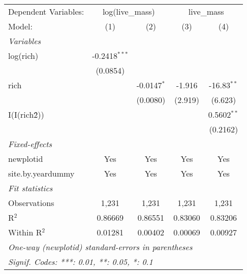 \begin{tabular}{lcccc}
\tabularnewline\midrule\midrule
Dependent Variables:&\multicolumn{2}{c}{log(live\_mass)}&\multicolumn{2}{c}{live\_mass}\\
Model:&(1) & (2) & (3) & (4)\\
\midrule \emph{Variables}&   &   &   &  \\
log(rich)&-0.2418$^{***}$ &    &    &   \\
  &(0.0854) &    &    &   \\
rich&   & -0.0147$^{*}$ & -1.916 & -16.83$^{**}$\\
  &   & (0.0080) & (2.919) & (6.623)\\
I(I(rich\^2))&   &    &    & 0.5602$^{**}$\\
  &   &    &    & (0.2162)\\
\midrule \emph{Fixed-effects}&   &   &   &  \\
newplotid & Yes & Yes & Yes & Yes\\
site.by.yeardummy & Yes & Yes & Yes & Yes\\
\midrule \emph{Fit statistics}&  & & & \\
Observations & 1,231&1,231&1,231&1,231\\
R$^2$ & 0.86669&0.86551&0.83060&0.83206\\
Within R$^2$ & 0.01281&0.00402&0.00069&0.00927\\
\midrule\midrule\multicolumn{5}{l}{\emph{One-way (newplotid) standard-errors in parentheses}}\\
\multicolumn{5}{l}{\emph{Signif. Codes: ***: 0.01, **: 0.05, *: 0.1}}\\
\end{tabular}



